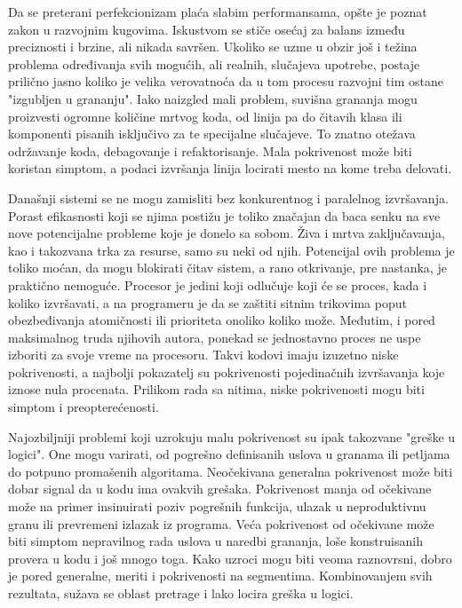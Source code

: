 \documentclass[12pt,oneside]{memoir}
\begin{document}
Da se preterani perfekcionizam plaća slabim performansama, opšte je poznat zakon u razvojnim kugovima. Iskustvom se stiče osećaj za balans između preciznosti i brzine, ali nikada savršen. Ukoliko se uzme u obzir još i težina problema određivanja svih mogućih, ali realnih, slučajeva upotrebe, postaje prilično jasno koliko je velika verovatnoća da u tom procesu razvojni tim ostane "izgubljen u grananju".  Iako naizgled mali problem, suvišna grananja mogu proizvesti ogromne količine mrtvog koda, od linija pa do čitavih klasa ili komponenti pisanih isključivo za te specijalne slučajeve. To znatno otežava održavanje koda, debagovanje i refaktorisanje. Mala pokrivenost može biti koristan simptom, a podaci izvršanja linija locirati mesto na kome treba delovati. 


Današnji sistemi se ne mogu zamisliti bez konkurentnog i paralelnog izvršavanja. Porast efikasnosti koji se njima postižu je toliko značajan da baca senku na sve nove potencijalne probleme koje je donelo sa sobom. Živa i mrtva zaključavanja, kao i takozvana trka za resurse, samo su neki od njih. Potencijal ovih problema je toliko moćan, da mogu blokirati čitav sistem, a rano otkrivanje, pre nastanka, je praktično nemoguće. Procesor je jedini koji odlučuje koji će se proces, kada i koliko izvršavati, a na programeru je da se zaštiti sitnim trikovima poput obezbeđivanja atomičnosti ili prioriteta onoliko koliko može. Međutim, i pored maksimalnog truda njihovih autora, ponekad se jednostavno proces ne uspe izboriti za svoje vreme na procesoru. Takvi kodovi imaju izuzetno niske pokrivenosti, a najbolji pokazatelj su pokrivenosti pojedinačnih izvršavanja koje iznose nula procenata. Prilikom rada sa nitima, niske pokrivenosti mogu biti simptom i preopterećenosti. 


Najozbiljniji problemi koji uzrokuju malu pokrivenost su ipak takozvane "greške u logici". One mogu varirati, od pogrešno definisanih uslova u granama ili petljama do potpuno promašenih algoritama. Neočekivana generalna pokrivenost može biti dobar signal da u kodu ima ovakvih grešaka. Pokrivenost manja od očekivane može na primer insinuirati poziv pogrešnih funkcija, ulazak u neproduktivnu granu ili prevremeni izlazak iz programa. Veća pokrivenost od očekivane može biti simptom nepravilnog rada uslova u naredbi grananja, loše konstruisanih provera u kodu i još mnogo toga. Kako uzroci mogu biti veoma raznovrsni, dobro je pored generalne, meriti i pokrivenosti na segmentima. Kombinovanjem svih rezultata, sužava se oblast pretrage i lako locira greška u logici. 
\end{document}
